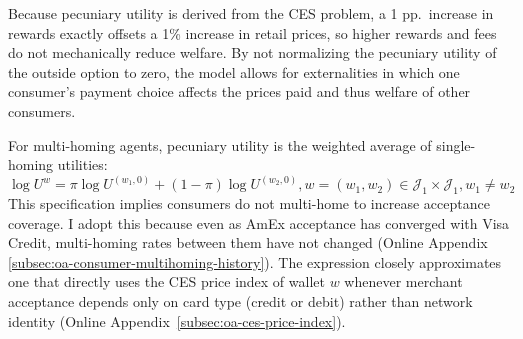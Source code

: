\documentclass[main.tex]{subfiles}
\begin{document}
Because pecuniary utility is derived from the CES problem, a 1 pp.\ increase in rewards exactly offsets a 1\% increase in retail prices, so higher rewards and fees do not mechanically reduce welfare.
By not normalizing the pecuniary utility of the outside option to zero, the model allows for externalities in which one consumer's payment choice affects the prices paid and thus welfare of other consumers.

For multi-homing agents, pecuniary utility is the weighted average of single-homing utilities:
\begin{equation}
  \log U^w = \pi \log U^{(w_1,0)} + (1 - \pi) \log U^{(w_2,0)}, w = (w_1,w_2)\in\mathcal{J}_1 \times \mathcal{J}_1, w_1 \neq w_2 \label{eq:pecuniary-definition-multihome}
\end{equation}
This specification implies consumers do not multi-home to increase acceptance coverage.
I adopt this because even as AmEx acceptance has converged with Visa Credit, multi-homing rates between them have not changed (Online Appendix \ref{subsec:oa-consumer-multihoming-history}).
The expression closely approximates one that directly uses the CES price index of wallet $w$ whenever merchant acceptance depends only on card type (credit or debit) rather than network identity (Online Appendix~\ref{subsec:oa-ces-price-index}).
\end{document}

